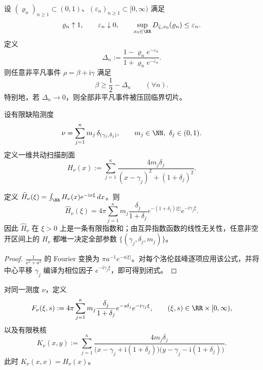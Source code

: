 \begin{theorem}[图表一致小化判别]\label{thm:unit-circle-comoving-uniform-minimization}
设 \((\varrho_n)_{n\ge 1}\subset(0,1)\)、\((\varepsilon_n)_{n\ge 1}\subset[0,\infty)\) 满足
\[
\varrho_n\uparrow 1,
\qquad
\varepsilon_n\downarrow 0,
\qquad
\sup_{x_0\in\RR}D_{\zeta,x_0}(\varrho_n)\le \varepsilon_n.
\]
定义
\[
\Delta_n:=\frac{1-\varrho_n e^{-\varepsilon_n}}{1+\varrho_n e^{-\varepsilon_n}}.
\]
则任意非平凡事件 \(\rho=\beta+\mathrm{i}\gamma\) 满足
\[
\beta\ge \frac12-\Delta_n
\qquad(\forall n).
\]
特别地，若 \(\Delta_n\to 0\)，则全部非平凡事件被压回临界切片。
\end{theorem}

\begin{definition}[有限缺陷测度与共动扫描剖面]\label{def:unit-circle-comoving-profile}
设有限缺陷测度
\[
\nu=\sum_{j=1}^{\kappa} m_j\,\delta_{(\gamma_j,\delta_j)},
\qquad
m_j\in\NN,\ \delta_j\in(0,1).
\]
定义一维共动扫描剖面
\[
H_\nu(x):=
\sum_{j=1}^{\kappa}
\frac{4m_j\delta_j}{(x-\gamma_j)^2+(1+\delta_j)^2}.
\]
\end{definition}

\begin{proposition}\label{prop:unit-circle-comoving-fourier-closed-form}
定义 \(\widehat H_\nu(\xi)=\int_{\RR}H_\nu(x)e^{-\mathrm{i} x\xi}\,dx\)。则
\[
\widehat H_\nu(\xi)=
4\pi\sum_{j=1}^{\kappa}
m_j\frac{\delta_j}{1+\delta_j}
e^{-(1+\delta_j)|\xi|}e^{-\mathrm{i}\gamma_j\xi}.
\]
因此 \(\widehat H_\nu\) 在 \(\xi>0\) 上是一条有限指数和；由互异指数函数的线性无关性，任意非空开区间上的 \(H_\nu\) 都唯一决定全部参数 \(\{(\gamma_j,\delta_j,m_j)\}\)。
\end{proposition}
\begin{proof}
\(\frac{1}{x^2+a^2}\) 的 Fourier 变换为 \(\pi a^{-1}e^{-a|\xi|}\)。对每个洛伦兹峰逐项应用该公式，并将中心平移 \(\gamma_j\) 编译为相位因子 \(e^{-\mathrm{i}\gamma_j\xi}\)，即可得到闭式。
\end{proof}

\begin{definition}\label{def:unit-circle-comoving-fingerprint}
对同一测度 \(\nu\)，定义
\[
F_\nu(\xi,s):=
4\pi\sum_{j=1}^{\kappa}
m_j\frac{\delta_j}{1+\delta_j}
e^{-s\delta_j}e^{-\mathrm{i}\gamma_j\xi},
\qquad
(\xi,s)\in\RR\times[0,\infty),
\]
以及有限秩核
\[
K_\nu(x,y):=
\sum_{j=1}^{\kappa}
\frac{4m_j\delta_j}{
\bigl(x-\gamma_j+\mathrm{i}(1+\delta_j)\bigr)
\bigl(y-\gamma_j-\mathrm{i}(1+\delta_j)\bigr)}.
\]
此时 \(K_\nu(x,x)=H_\nu(x)\)。
\end{definition}

